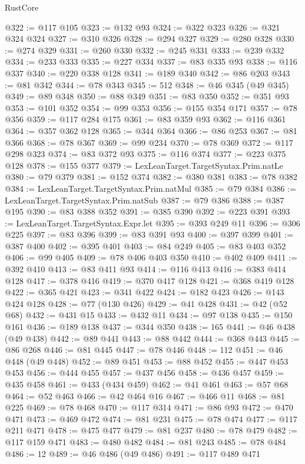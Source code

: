 \begin{lexlean}{RustCore}
\begin{coremodule}
@322 := @117 @105
@323 := @132 @93
@324 := @322 @323
@326 := @321 @324 @324
@327 := @310 @326
@328 := @294 @327
@329 := @280 @328
@330 := @274 @329
@331 := @260 @330
@332 := @245 @331
@333 := @239 @332
@334 := @233 @333
@335 := @227 @334
@337 := @83 @335 @93
@338 := @116 @337
@340 := @220 @338 @128
@341 := @189 @340
@342 := @86 @203
@343 := @81 @342
@344 := @78 @343
@345 := 512
@348 := @46 @345 (@49 @345)
@349 := @89 @348
@350 := @88 @349
@351 := @83 @350
@352 := @351 @93
@353 := @101 @352
@354 := @99 @353
@356 := @155 @354 @171
@357 := @78 @356
@359 := @117 @284 @175
@361 := @83 @359 @93
@362 := @116 @361
@364 := @357 @362 @128
@365 := @344 @364
@366 := @86 @253
@367 := @81 @366
@368 := @78 @367
@369 := @99 @234
@370 := @78 @369
@372 := @117 @298 @323
@374 := @83 @372 @93
@375 := @116 @374
@377 := @223 @375 @128
@378 := @155 @377
@379 := LexLeanTarget.TargetSyntax.Prim.natLe
@380 := @79 @379
@381 := @152 @374
@382 := @380 @381
@383 := @78 @382
@384 := LexLeanTarget.TargetSyntax.Prim.natMul
@385 := @79 @384
@386 := LexLeanTarget.TargetSyntax.Prim.natSub
@387 := @79 @386
@388 := @387 @195
@390 := @83 @388 @352
@391 := @385 @390
@392 := @223 @391
@393 := LexLeanTarget.TargetSyntax.Expr.let
@395 := @393 @249 @11
@396 := @306 @225
@397 := @83 @396
@399 := @83 @391 @93
@400 := @397 @399
@401 := @387 @400
@402 := @395 @401
@403 := @84 @249
@405 := @83 @403 @352
@406 := @99 @405
@409 := @78 @406 @403 @350
@410 := @402 @409
@411 := @392 @410
@413 := @83 @411 @93
@414 := @116 @413
@416 := @383 @414 @128
@417 := @378 @416
@419 := @370 @417 @128
@421 := @368 @419 @128
@422 := @365 @421
@423 := @341 @422
@424 := @182 @423
@426 := @143 @424 @128
@428 := @77 (@130 @426)
@429 := @41 @428
@431 := @42 (@52 @68)
@432 := @431 @15
@433 := @432 @11
@434 := @97 @138
@435 := @150 @161
@436 := @189 @138
@437 := @344 @350
@438 := 165
@441 := @46 @438 (@49 @438)
@442 := @89 @441
@443 := @88 @442
@444 := @368 @443
@445 := @86 @268
@446 := @81 @445
@447 := @78 @446
@448 := 112
@451 := @46 @448 (@49 @448)
@452 := @89 @451
@453 := @88 @452
@455 := @447 @453 @453
@456 := @444 @455
@457 := @437 @456
@458 := @436 @457
@459 := @435 @458
@461 := @433 (@434 @459)
@462 := @41 @461
@463 := @57 @68
@464 := @52 @463
@466 := @42 @464 @16
@467 := @466 @11
@468 := @81 @225
@469 := @78 @468
@470 := @117 @314
@471 := @86 @93
@472 := @470 @471
@473 := @469 @472
@474 := @81 @231
@475 := @78 @474
@477 := @117 @211 @471
@478 := @475 @477
@479 := @81 @237
@480 := @78 @479
@482 := @117 @159 @471
@483 := @480 @482
@484 := @81 @243
@485 := @78 @484
@486 := 12
@489 := @46 @486 (@49 @486)
@491 := @117 @489 @471

\end{coremodule}
\end{lexlean}
